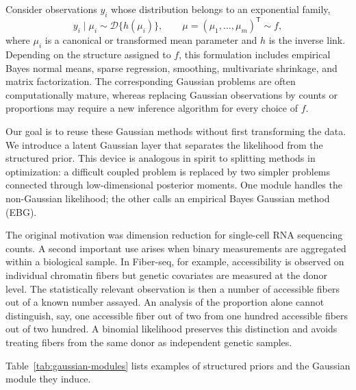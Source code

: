 \documentclass[11pt]{article}
\begin{document}
Consider observations $y_i$ whose distribution belongs to an exponential
family,
\begin{equation}
  y_i\mid \mu_i \sim \mathcal{D}\{h(\mu_i)\},
  \qquad
  \mu=(\mu_1,\ldots,\mu_m)^\mathsf{T}\sim f,
  \label{eq:general-model}
\end{equation}
where $\mu_i$ is a canonical or transformed mean parameter and $h$ is the
inverse link. Depending on the structure assigned to $f$, this formulation
includes empirical Bayes normal means, sparse regression, smoothing,
multivariate shrinkage, and matrix factorization. The corresponding Gaussian
problems are often computationally mature, whereas replacing Gaussian
observations by counts or proportions may require a new inference algorithm
for every choice of $f$.

Our goal is to reuse these Gaussian methods without first transforming the
data. We introduce a latent Gaussian layer that separates the likelihood from
the structured prior. This device is analogous in spirit to splitting methods
in optimization: a difficult coupled problem is replaced by two simpler
problems connected through low-dimensional posterior moments. One module
handles the non-Gaussian likelihood; the other calls an empirical Bayes
Gaussian method (EBG).

The original motivation was dimension reduction for single-cell RNA
sequencing counts. A second important use arises when binary measurements are
aggregated within a biological sample. In Fiber-seq, for example, accessibility
is observed on individual chromatin fibers but genetic covariates are measured
at the donor level. The statistically relevant observation is then a number of
accessible fibers out of a known number assayed. An analysis of the proportion
alone cannot distinguish, say, one accessible fiber out of two from one
hundred accessible fibers out of two hundred. A binomial likelihood preserves
this distinction and avoids treating fibers from the same donor as independent
genetic samples.

Table~\ref{tab:gaussian-modules} lists examples of structured priors and the
Gaussian module they induce.
\end{document}
